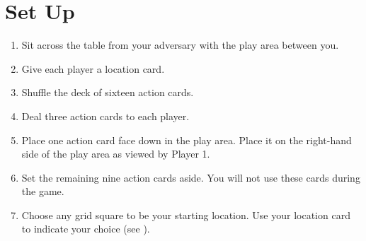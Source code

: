 \section*{Set Up}
\begin{enumerate}[leftmargin=*]
	\item Sit across the table from your adversary with the play area between you.
	\item Give each player a location card. 
	\item Shuffle the deck of sixteen action cards.
	\item Deal three action cards to each player.
	\item Place one action card face down in the play area. Place it on the right-hand side of the play area as viewed by Player 1.
	\item Set the remaining nine action cards aside. You will not use these cards during the game.
	\item Choose any grid square to be your starting location. Use your location card to indicate your choice (see {}).
\end{enumerate}

